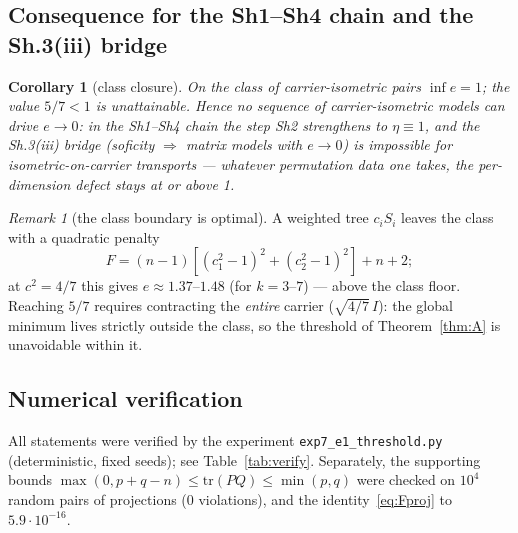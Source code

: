 \documentclass[11pt,a4paper]{article}
\newtheorem{corollary}[theorem]{Corollary}
\theoremstyle{definition}
\theoremstyle{remark}
\newtheorem{remark}[theorem]{Remark}
\begin{document}
\subsection{Consequence for the Sh1--Sh4 chain and the Sh.3(iii) bridge}

\begin{corollary}[class closure]\label{cor:D}
On the class of carrier-isometric pairs $\inf e = 1$; the value $5/7 < 1$
is unattainable. Hence no sequence of carrier-isometric models can drive
$e \to 0$: in the Sh1--Sh4 chain the step Sh2 strengthens to
$\eta \equiv 1$, and the Sh.3(iii) bridge (soficity $\Rightarrow$ matrix
models with $e \to 0$) is impossible for isometric-on-carrier transports ---
whatever permutation data one takes, the per-dimension defect stays at or
above 1.
\end{corollary}

\begin{remark}[the class boundary is optimal]
A weighted tree $c_iS_i$ leaves the class with a quadratic penalty
\begin{equation}\label{eq:weightedtree}
F = (n-1)[(c_1^2{-}1)^2 + (c_2^2{-}1)^2] + n + 2;
\end{equation}
at
$c^2 = 4/7$ this gives $e \approx 1.37$--$1.48$ (for $k = 3$--$7$) --- above
the class floor. Reaching $5/7$ requires contracting the \emph{entire}
carrier ($\sqrt{4/7}\,I$): the global minimum lives strictly outside the
class, so the threshold of Theorem~\ref{thm:A} is unavoidable within it.
\end{remark}

\subsection{Numerical verification}

All statements were verified by the experiment \texttt{exp7\_e1\_threshold.py}
(deterministic, fixed seeds); see Table~\ref{tab:verify}. Separately, the
supporting bounds $\max(0, p+q-n) \le \mathrm{tr}(PQ) \le \min(p,q)$ were
checked on $10^4$ random pairs of projections (0 violations), and the
identity~\eqref{eq:Fproj} to $5.9\cdot 10^{-16}$.
\end{document}
